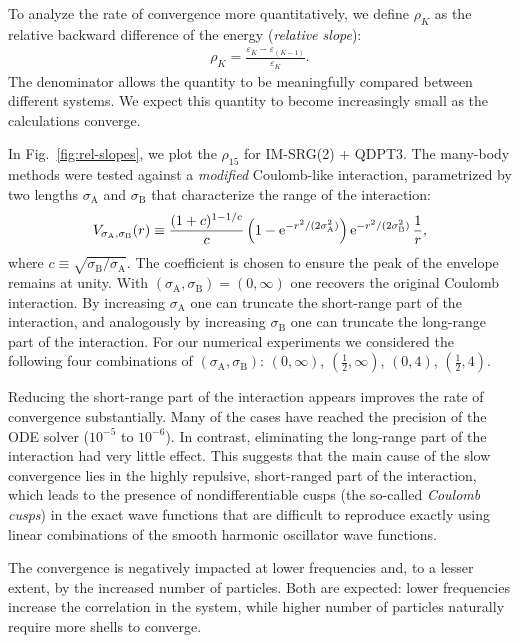 To analyze the rate of convergence more quantitatively, we define $\rho_K$ as the relative backward difference of the energy (\textit{relative slope}):
\begin{align*}
  \rho_K = \frac{\varepsilon_K - \varepsilon_{(K - 1)}}{\varepsilon_K}.
\end{align*}
The denominator allows the quantity to be meaningfully compared between different systems.  We expect this quantity to become increasingly small as the calculations converge.

In Fig.\ \ref{fig:rel-slopes}, we plot the $\rho_{15}$ for IM-SRG(2) + QDPT3.  The many-body methods were tested against a \emph{modified} Coulomb-like interaction, parametrized by two lengths $\sigma_{\mathrm{A}}$ and $\sigma_{\mathrm{B}}$ that characterize the range of the interaction:
\begin{align}
  V_{\sigma_{\mathrm{A}}, \sigma_{\mathrm{B}}}(r) \equiv \frac{(1 + c)^{1 - 1/c}}{c} \left(1 - \operatorname{e}^{-r^2 / (2 \sigma_{\mathrm{A}}^2)}\right) \operatorname{e}^{-r^2 / (2 \sigma_{\mathrm{B}}^2)} \frac{1}{r},
\end{align}
where $c \equiv \sqrt{\sigma_{\mathrm{B}} / \sigma_{\mathrm{A}}}$.  The coefficient is chosen to ensure the peak of the envelope remains at unity.  With $(\sigma_{\mathrm{A}}, \sigma_{\mathrm{B}}) = (0, \infty)$ one recovers the original Coulomb interaction.  By increasing $\sigma_{\mathrm{A}}$ one can truncate the short-range part of the interaction, and analogously by increasing $\sigma_{\mathrm{B}}$ one can truncate the long-range part of the interaction.  For our numerical experiments we considered the following four combinations of $(\sigma_{\mathrm{A}}, \sigma_{\mathrm{B}})$: $(0, \infty)$, $(\frac{1}{2}, \infty)$, $(0, 4)$, $(\frac{1}{2}, 4)$.

Reducing the short-range part of the interaction appears improves the rate of convergence substantially.  Many of the cases have reached the precision of the ODE solver ($10^{-5}$ to $10^{-6}$).  In contrast, eliminating the long-range part of the interaction had very little effect.  This suggests that the main cause of the slow convergence lies in the highly repulsive, short-ranged part of the interaction, which leads to the presence of nondifferentiable cusps (the so-called \textit{Coulomb cusps}) in the exact wave functions that are difficult to reproduce exactly using linear combinations of the smooth harmonic oscillator wave functions.

The convergence is negatively impacted at lower frequencies and, to a lesser extent, by the increased number of particles.  Both are expected: lower frequencies increase the correlation in the system, while higher number of particles naturally require more shells to converge.

